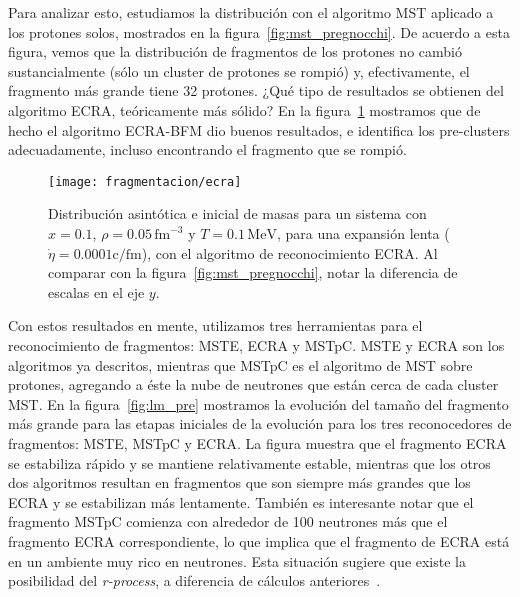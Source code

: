 Para analizar esto, estudiamos la distribución con el algoritmo MST aplicado a los protones solos, mostrados en la figura~\ref{fig:mst_pregnocchi}.
De acuerdo a esta figura, vemos que la distribución de fragmentos de los protones no cambió sustancialmente (sólo un cluster de protones se rompió) y, efectivamente, el fragmento más grande tiene 32 protones.
¿Qué tipo de resultados se obtienen del algoritmo ECRA, teóricamente más sólido?
En la figura~\ref{fig:ecra_pregnocchi} mostramos que de hecho el algoritmo ECRA-BFM dio buenos resultados, e identifica los pre-clusters adecuadamente, incluso encontrando el fragmento que se rompió.

\begin{figure}
  \texttt{[image: fragmentacion/ecra]}
  \caption{Distribución asintótica e inicial de masas para un sistema con $x = 0.1$, $\rho = 0.05\,\text{fm}^{-3}$ y $T = 0.1\,\text{MeV}$, para una expansión lenta ($\dot{\eta} = 0.0001\text{c/fm}$), con el algoritmo de reconocimiento ECRA. Al comparar con la figura~\ref{fig:mst_pregnocchi}, notar la diferencia de escalas en el eje $y$.}
\label{fig:ecra_pregnocchi}
\end{figure}

Con estos resultados en mente, utilizamos tres herramientas para el reconocimiento de fragmentos: MSTE, ECRA y MSTpC.
MSTE y ECRA son los algoritmos ya descritos, mientras que MSTpC es el algoritmo de MST sobre protones, agregando a éste la nube de neutrones que están cerca de cada cluster MST.\@
En la figura~\ref{fig:lm_pre} mostramos la evolución del tamaño del fragmento más grande para las etapas iniciales de la evolución para los tres reconocedores de fragmentos: MSTE, MSTpC y ECRA.\@
La figura muestra que el fragmento ECRA se estabiliza rápido y se mantiene relativamente estable, mientras que los otros dos algoritmos resultan en fragmentos que son siempre más grandes que los ECRA y se estabilizan más lentamente.
También es interesante notar que el fragmento MSTpC comienza con alrededor de 100 neutrones más que el fragmento ECRA correspondiente, lo que implica que el fragmento de ECRA está en un ambiente muy rico en neutrones.
Esta situación sugiere que existe la posibilidad del \emph{r-process}, a diferencia de cálculos anteriores~\cite{caplan_pasta_2015}.

